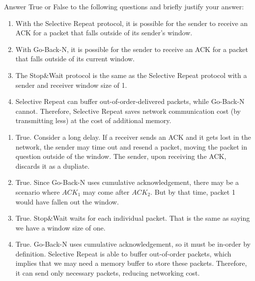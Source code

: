 \documentclass{report}
\begin{document}
%
\newpage
\begin{problem}
Answer True or False to the following questions and briefly justify your answer:
\begin{enumerate}
  \item With the Selective Repeat protocol, it is possible for the sender to receive an ACK for a packet that falls outside of its sender's window.
  \item With Go-Back-N, it is possible for the sender to receive an ACK for a packet that falls outside of its current window.
  \item The Stop\&Wait protocol is the same as the Selective Repeat protocol with a sender and receiver window size of 1.
  \item Selective Repeat can buffer out-of-order-delivered packets, while Go-Back-N cannot. Therefore, Selective Repeat saves network communication cost (by transmitting less) at the cost of additional memory.
\end{enumerate}

\begin{answer}{45em}
    \begin{enumerate}[label=(\alph*)]
        \item True. Consider a long delay. If a receiver sends an ACK and it gets lost in the 
            network, the sender may time
            out and resend a packet, moving the packet in question outside of the window. The sender,
            upon receiving the ACK, discards it as a dupliate.  
        \item True. Since Go-Back-N uses cumulative acknowledgement, there may be a scenario where 
            $ACK_1$ may come after $ACK_2$. But by that time, packet 1 would have fallen out the 
            window.
        \item True. Stop\&Wait waits for each individual packet. That is the same as saying we have
            a window size of one.
        \item True. Go-Back-N uses cumulative acknowledgement, so it must be in-order by definition.
            Selective Repeat is able to buffer out-of-order packets, which implies that we may need
            a memory buffer to store these packets. Therefore, it can send only necessary packets, 
            reducing networking cost.
    \end{enumerate}
\end{answer}

\end{problem}
\end{document}
